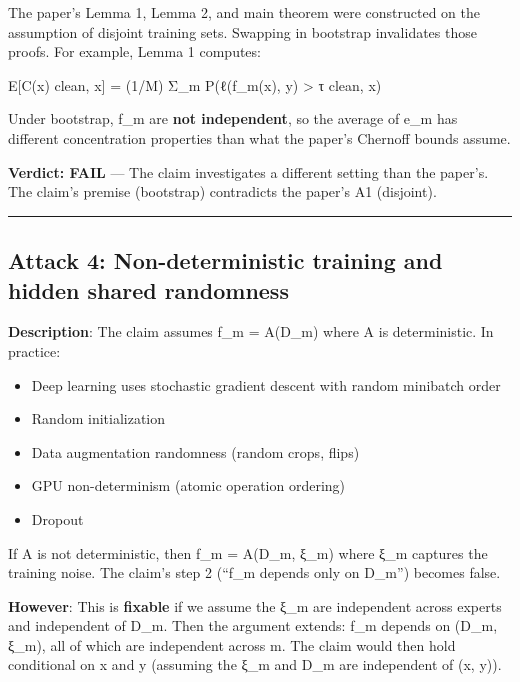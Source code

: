 \documentclass[
  12pt,
]{article}
\providecommand{\tightlist}{%
  \setlength{\itemsep}{0pt}\setlength{\parskip}{0pt}}
\begin{document}
The paper's Lemma 1, Lemma 2, and main theorem were constructed on the
assumption of disjoint training sets. Swapping in bootstrap invalidates
those proofs. For example, Lemma 1 computes:

E{[}C(x) \textbar{} clean, x{]} = (1/M) Σ\_m P(ℓ(f\_m(x), y)
\textgreater{} τ \textbar{} clean, x)

Under bootstrap, f\_m are \textbf{not independent}, so the average of
e\_m has different concentration properties than what the paper's
Chernoff bounds assume.

\textbf{Verdict: FAIL} --- The claim investigates a different setting
than the paper's. The claim's premise (bootstrap) contradicts the
paper's A1 (disjoint).

\begin{center}\rule{0.5\linewidth}{0.5pt}\end{center}

\subsection{Attack 4: Non-deterministic training and hidden shared
randomness}\label{attack-4-non-deterministic-training-and-hidden-shared-randomness}

\textbf{Description}: The claim assumes f\_m = A(D\_m) where A is
deterministic. In practice:

\begin{itemize}
\tightlist
\item
  Deep learning uses stochastic gradient descent with random minibatch
  order
\item
  Random initialization
\item
  Data augmentation randomness (random crops, flips)
\item
  GPU non-determinism (atomic operation ordering)
\item
  Dropout
\end{itemize}

If A is not deterministic, then f\_m = A(D\_m, ξ\_m) where ξ\_m captures
the training noise. The claim's step 2 (``f\_m depends only on D\_m'')
becomes false.

\textbf{However}: This is \textbf{fixable} if we assume the ξ\_m are
independent across experts and independent of D\_m. Then the argument
extends: f\_m depends on (D\_m, ξ\_m), all of which are independent
across m. The claim would then hold conditional on x and y (assuming the
ξ\_m and D\_m are independent of (x, y)).
\end{document}
